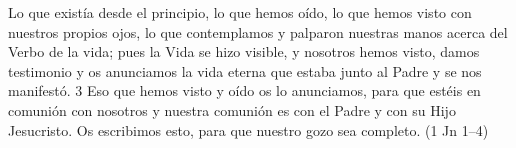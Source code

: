 Lo que existía desde el principio, lo que hemos oído, lo que hemos visto con nuestros propios ojos, lo que contemplamos y palparon nuestras manos acerca del Verbo de la vida; pues la Vida se hizo visible, y nosotros hemos visto, damos testimonio y os anunciamos la vida eterna que estaba junto al Padre y se nos manifestó. 3 Eso que hemos visto y oído os lo anunciamos, para que estéis en comunión con nosotros y nuestra comunión es con el Padre y con su Hijo Jesucristo. Os escribimos esto, para que nuestro gozo sea completo. (1 Jn 1--4)
